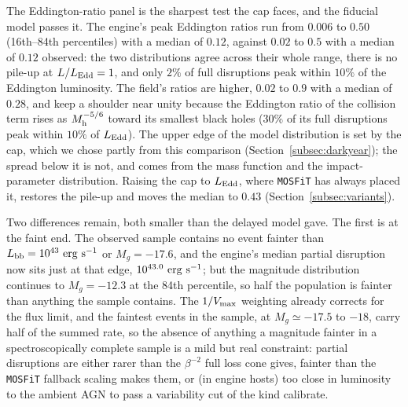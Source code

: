 \documentclass[twocolumn,pdftex]{aastex701}
\newcommand{\mosfit}{{\tt MOSFiT}\xspace}
\begin{document}
The Eddington-ratio panel is the sharpest test the cap faces, and the fiducial model passes it. The engine's peak Eddington ratios run from $0.006$ to $0.50$ (16th--84th percentiles) with a median of $0.12$, against $0.02$ to $0.5$ with a median of $0.12$ observed: the two distributions agree across their whole range, there is no pile-up at $L/L_{\rm Edd} = 1$, and only $2\%$ of full disruptions peak within $10\%$ of the Eddington luminosity. The field's ratios are higher, $0.02$ to $0.9$ with a median of $0.28$, and keep a shoulder near unity because the Eddington ratio of the collision term rises as $M_{\rm h}^{-5/6}$ toward its smallest black holes ($30\%$ of its full disruptions peak within $10\%$ of $L_{\rm Edd}$). The upper edge of the model distribution is set by the cap, which we chose partly from this comparison (Section~\ref{subsec:darkyear}); the spread below it is not, and comes from the mass function and the impact-parameter distribution. Raising the cap to $L_{\rm Edd}$, where \mosfit has always placed it, restores the pile-up and moves the median to $0.43$ (Section~\ref{subsec:variants}).

Two differences remain, both smaller than the delayed model gave. The first is at the faint end. The observed sample contains no event fainter than $L_{\rm bb} = 10^{43}~{\rm erg~s^{-1}}$ or $M_g = -17.6$, and the engine's median partial disruption now sits just at that edge, $10^{43.0}~{\rm erg~s^{-1}}$; but the magnitude distribution continues to $M_g = -12.3$ at the 84th percentile, so half the population is fainter than anything the sample contains. The $1/V_{\rm max}$ weighting already corrects for the flux limit, and the faintest events in the sample, at $M_g \simeq -17.5$ to $-18$, carry half of the summed rate, so the absence of anything a magnitude fainter in a spectroscopically complete sample is a mild but real constraint: partial disruptions are either rarer than the $\beta^{-2}$ full loss cone gives, fainter than the \mosfit fallback scaling makes them, or (in engine hosts) too close in luminosity to the ambient AGN to pass a variability cut of the kind \citet{Magill:2026b} calibrate.
\end{document}
